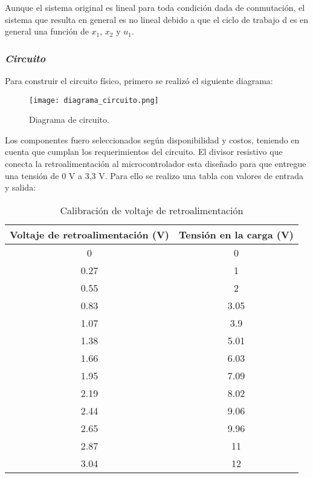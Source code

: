 Aunque el sistema original es lineal para toda condición dada de conmutación, el sistema que resulta 
en general es no lineal debido a que el ciclo de trabajo d es en general una función de $x_1$, $x_2$ y $u_1$. \parencite{RASHID}


\subsubsection*{\it{Circuito}}
\vspace{-0.25cm}

Para construir el circuito físico, primero se realizó el siguiente diagrama:

\begin{figure}[H]
    \centering
    \texttt{[image: diagrama\_circuito.png]}
    \vspace{-0.25cm}
    \caption{Diagrama de circuito.}
    \label{fig:diagrama_circuito}
\end{figure}

Los componentes fuero seleccionados según disponibilidad y costos, teniendo en cuenta que cumplan los requerimientos del circuito.
El divisor resistivo que conecta la retroalimentación al microcontrolador esta diseñado para que entregue una 
tensión de 0 V a 3,3 V. Para ello se realizo una tabla con valores de entrada y salida:

\begin{table}[H]
    \centering
    \begin{tabular}{|c|c|}
    \hline
    Voltaje de retroalimentación (V) & Tensión en la carga (V) \\ \hline
    0                                & 0                       \\
    0.27                             & 1                       \\
    0.55                             & 2                       \\
    0.83                             & 3.05                    \\
    1.07                             & 3.9                     \\
    1.38                             & 5.01                    \\
    1.66                             & 6.03                    \\
    1.95                             & 7.09                    \\
    2.19                             & 8.02                    \\
    2.44                             & 9.06                    \\
    2.65                             & 9.96                    \\
    2.87                             & 11                      \\
    3.04                             & 12                      \\ \hline
    \end{tabular}
    \label{tab:calibración_fb}
    \vspace{-0.25cm}
    \caption{Calibración de voltaje de retroalimentación}
\end{table}

